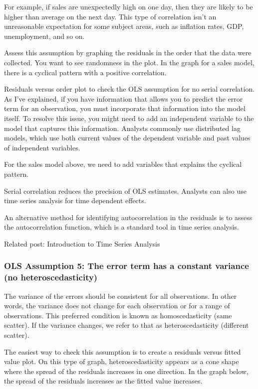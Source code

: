 \documentclass[12pt]{book}
\begin{document}
For example, if sales are unexpectedly high on one day, then they are likely to be higher than average on the next day. This type of correlation isn’t an unreasonable expectation for some subject areas, such as inflation rates, GDP, unemployment, and so on.

Assess this assumption by graphing the residuals in the order that the data were collected. You want to see randomness in the plot. In the graph for a sales model, there is a cyclical pattern with a positive correlation.

Residuals versus order plot to check the OLS assumption for no serial correlation.
As I’ve explained, if you have information that allows you to predict the error term for an observation, you must incorporate that information into the model itself. To resolve this issue, you might need to add an independent variable to the model that captures this information. Analysts commonly use distributed lag models, which use both current values of the dependent variable and past values of independent variables.

For the sales model above, we need to add variables that explains the cyclical pattern.

Serial correlation reduces the precision of OLS estimates. Analysts can also use time series analysis for time dependent effects.

An alternative method for identifying autocorrelation in the residuals is to assess the autocorrelation function, which is a standard tool in time series analysis.

Related post: Introduction to Time Series Analysis

\subsubsection{OLS Assumption 5: The error term has a constant variance (no heteroscedasticity)}
The variance of the errors should be consistent for all observations. In other words, the variance does not change for each observation or for a range of observations. This preferred condition is known as homoscedasticity (same scatter). If the variance changes, we refer to that as heteroscedasticity (different scatter).

The easiest way to check this assumption is to create a residuals versus fitted value plot. On this type of graph, heteroscedasticity appears as a cone shape where the spread of the residuals increases in one direction. In the graph below, the spread of the residuals increases as the fitted value increases.
\end{document}
